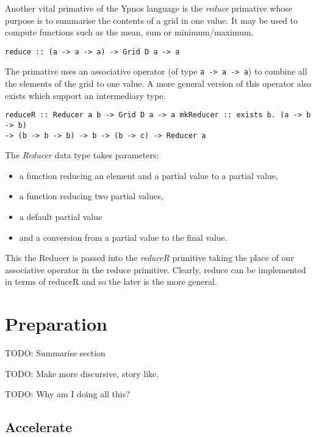 Another vital primative of the Ypnos language is the \emph{reduce}
primative whose purpose is to summarise the contents of a grid in one
value. It may be used to compute functions such as the mean, sum or
minimum/maximum.

\begin{verbatim}
reduce :: (a -> a -> a) -> Grid D a -> a
\end{verbatim}

The primative uses an associative operator (of type
\texttt{a -\textgreater{} a -\textgreater{} a}) to combine all the
elements of the grid to one value. A more general version of this
operator also exists which support an intermediary type.

\begin{verbatim}
reduceR :: Reducer a b -> Grid D a -> a mkReducer :: exists b. (a -> b -> b)
-> (b -> b -> b) -> b -> (b -> c) -> Reducer a
\end{verbatim}

The \emph{Reducer} data type takes parameters:

\begin{itemize}
\itemsep1pt\parskip0pt
\item
  a function reducing an element and a partial value to a partial value,
\item
  a function reducing two partial values,
\item
  a default partial value
\item
  and a conversion from a partial value to the final value.
\end{itemize}

This the Reducer is passed into the \emph{reduceR} primitive taking the
place of our associative operator in the reduce primitive. Clearly,
reduce can be implemented in terms of reduceR and so the later is the
more general.

\section{Preparation}

TODO: Summarise section

TODO: Make more discursive, story like.

TODO: Why am I doing all this?

\subsection{Accelerate}

